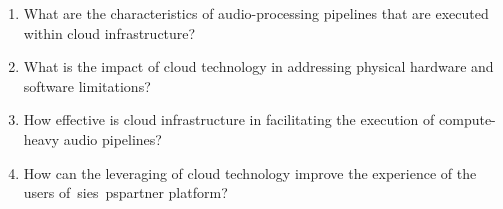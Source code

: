 \begin{enumerate}
    \item What are the characteristics of audio-processing pipelines that are executed within cloud infrastructure?
    \item What is the impact of cloud technology in addressing physical hardware and software limitations?
    \item How effective is cloud infrastructure in facilitating the execution of compute-heavy audio pipelines?
    \item How can the leveraging of cloud technology improve the experience of the users of~\glspl{sie}~\gls{pspartner} platform?
\end{enumerate}